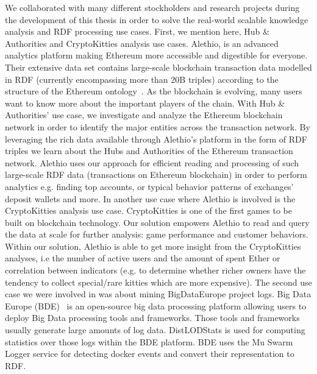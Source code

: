 \begin{enumerate}
    We collaborated with many different stockholders and research projects during the development of this thesis in order to solve the real-world scalable knowledge analysis and \gls{RDF} processing use cases.
    First, we mention here, Hub \& Authorities and CryptoKitties analysis use cases. 
    Alethio, is an advanced analytics platform making Ethereum more accessible and digestible for everyone.
    Their extensive data set contains large-scale blockchain transaction data modelled in \gls{RDF} (currently encompassing more than 20B triples) according to the structure of the Ethereum ontology~\cite{pfeffer2016ethon}.
    As the blockchain is evolving, many users want to know more about the important players of the chain. 
    With Hub \& Authorities' use case, we investigate and analyze the Ethereum blockchain network in order to identify the major entities across the transaction network. 
    By leveraging the rich data available through Alethio's platform in the form of \gls{RDF} triples we learn about the Hubs and Authorities of the Ethereum transaction network.
    Alethio uses our approach for efficient reading and processing of such large-scale \gls{RDF} data (transactions on Ethereum blockchain) in order to perform analytics e.g. finding top accounts, or typical behavior patterns of exchanges' deposit wallets and more.
    In another use case where Alethio is involved is the CryptoKitties analysis use case.
    CryptoKitties is one of the first games to be built on blockchain technology.
    Our solution empowers Alethio to read and query the data at scale for further analysis: game performance and customer behaviors.
    Within our solution, Alethio is able to get more insight from the CryptoKitties analyses, i.e the number of active users and the amount of spent Ether or correlation between indicators (e.g. to determine whether richer owners have the tendency to collect special/rare kitties which are more expensive).
    The second use case we were involved in was about mining BigDataEurope project logs.
    Big Data Europe (BDE)~\cite{Auer+ICWE-2017} is an open-source big data processing platform allowing users to deploy Big Data processing tools and frameworks. 
    Those tools and frameworks usually generate large amounts of log data. 
    DistLODStats is used for computing statistics over those logs within the BDE platform. 
    BDE uses the Mu Swarm Logger service for detecting docker events and convert their representation to \gls{RDF}. 

\end{enumerate}
